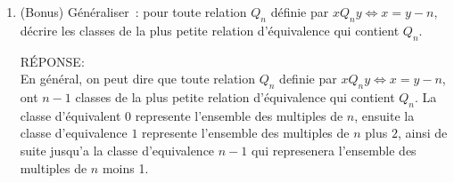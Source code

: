 \begin{enumerate}[\bf 1.]
\begin{framed}
\end{framed}
\item{} (Bonus) Généraliser~:  pour toute relation $Q_n$ définie par $xQ_ny \Longleftrightarrow x= y -  n,$ décrire les classes  de la plus petite relation d'\'equivalence qui contient $Q_n$.
\begin{framed}

RÉPONSE:\\
En général, on peut dire que toute relation $Q_n$ definie par $xQ_ny \Longleftrightarrow x = y - n$, ont $n-1$ classes de la plus petite relation d'équivalence qui contient $Q_n$. La classe d'équivalent $0$ represente l'ensemble des multiples de $n$, ensuite la classe d'equivalence $1$ represente l'ensemble des multiples de $n$ plus $2$, ainsi de suite jusqu'a la classe d'equivalence $n-1$ qui represenera l'ensemble des multiples de $n$ moins 1.

\end{framed}
\end{enumerate}
